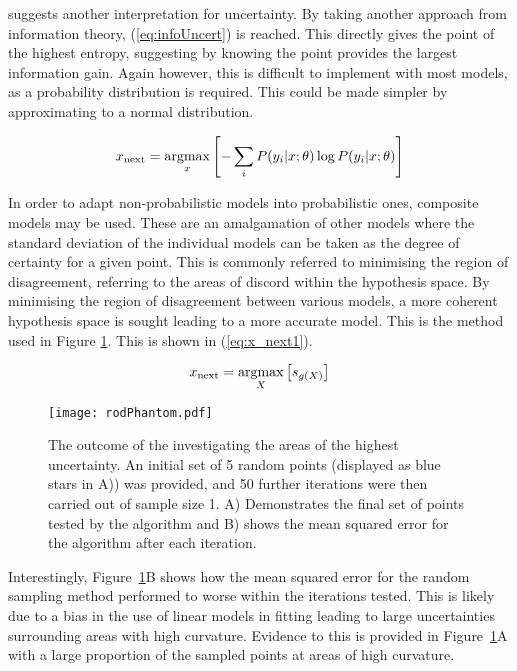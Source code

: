\textcite{Set09} suggests another interpretation for uncertainty. By taking another approach from information theory, (\ref{eq:infoUncert}) is reached. This directly gives the point of the highest entropy, suggesting by knowing the point provides the largest information gain. Again however, this is difficult to implement with most models, as a probability distribution is required. This could be made simpler by approximating to a normal distribution.

\begin{equation}
    \label{eq:infoUncert}
    x_\mathrm{next}=\operatorname*{argmax}_x{\left[-\sum_i{P(y_i|x;\theta)\log{P(y_i|x;\theta)}}\right]}
\end{equation}


In order to adapt non-probabilistic models into probabilistic ones, composite models may be used. These are an amalgamation of other models where the standard deviation of the individual models can be taken as the degree of certainty for a given point. This is commonly referred to minimising the region of disagreement, referring to the areas of discord within the hypothesis space. By minimising the region of disagreement between various models, a more coherent hypothesis space is sought leading to a more accurate model. This is the method used in Figure \ref{fig:rodPhantom}. This is shown in (\ref{eq:x_next1}).

\begin{equation}
    \label{eq:x_next1}
    x_\mathrm{next}=\operatorname*{argmax}_X{\left[s_{g(X)}\right]}
\end{equation}

\begin{figure}[H]
    \begin{center}
        \texttt{[image: rodPhantom.pdf]}
        \caption[Uncertainty Sampling Demonstration]{The outcome of the investigating the areas of the highest uncertainty. An initial set of 5 random points (displayed as blue stars in A)) was provided, and 50 further iterations were then carried out of sample size 1. A) Demonstrates the final set of points tested by the algorithm and B) shows the mean squared error for the algorithm after each iteration.}
        \label{fig:rodPhantom}
    \end{center}
\end{figure}

Interestingly, Figure~\ref{fig:rodPhantom}B shows how the mean squared error for the random sampling method performed to worse within the iterations tested. This is likely due to a bias in the use of linear models in fitting leading to large uncertainties surrounding areas with high curvature. Evidence to this is provided in Figure~\ref{fig:rodPhantom}A with a large proportion of the sampled points at areas of high curvature.


